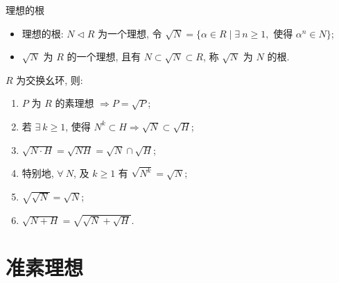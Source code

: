 \begin{frame}{理想的根}

\begin{itemize}
\item 理想的根: $N \lhd R$ 为一个理想, 令
  $\sqrt{N} = \{ \alpha \in R \mid \exists\ n \geqslant 1,$
  使得 $\alpha^n \in N \}$;
\item $\sqrt{N}$ 为 $R$ 的一个理想, 且有 $N \subset \sqrt{N} \subset R$,
  称 $\sqrt{N}$ 为 $N$ 的根.
\end{itemize}

\pause

\begin{lem}[根的运算]
$R$ 为交换幺环, 则:
\begin{enumerate}
\item[(i)] $P$ 为 $R$ 的素理想 $\Longrightarrow P = \sqrt{P}$;
\item[(ii)] 若 $\exists\ k \geqslant 1$, 使得 $N^k \subset H
  \Longrightarrow \sqrt{N} \subset \sqrt{H}$;
\item[(iii)] $\sqrt{N \cdot H} = \sqrt{NH} = \sqrt{N} \cap \sqrt{H}$;
\item[] \hspace{3em} 特别地, $\forall\ N$, 及 $k \geqslant 1$ 有 $\sqrt{N^k} = \sqrt{N}$;
\item[(iv)] $\sqrt{\sqrt{N}} = \sqrt{N}$;
\item[(v)] $\sqrt{N + H} = \sqrt{\sqrt{N} + \sqrt{H}}$.
\end{enumerate}
\end{lem}

\end{frame}


\section[准素理想]{准素理想}


